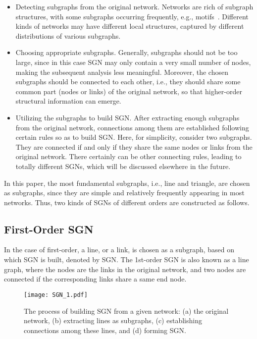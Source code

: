 \documentclass[10pt,journal,compsoc]{IEEEtran}
\begin{document}
\begin{itemize}
\item Detecting subgraphs from the original network. Networks are rich of subgraph structures, with some subgraphs occurring frequently, e.g., motifs~\cite{wernicke2006efficient}. Different kinds of networks may have different local structures, captured by different distributions of various subgraphs.
\item Choosing appropriate subgraphs. Generally, subgraphs should not be too large, since in this case SGN may only contain a very small number of nodes, making the subsequent analysis less meaningful. Moreover, the chosen subgraphs should be connected to each other, i.e., they should share some common part (nodes or links) of the original network, so that higher-order structural information can emerge.
\item Utilizing the subgraphs to build SGN. After extracting enough subgraphs from the original network, connections among them are established following certain rules so as to build SGN. Here, for simplicity, consider two subgraphs. They are connected if and only if they share the same nodes or links from the original network. There certainly can be other connecting rules, leading to totally different SGNs, which will be discussed elsewhere in the future.
\end{itemize}

In this paper, the most fundamental subgraphs, i.e., line and triangle, are chosen as subgraphs, since they are simple and relatively frequently appearing in most networks. Thus, two kinds of SGNs of different orders are constructed as follows.

\subsection{First-Order SGN}
In the case of first-order, a line, or a link, is chosen as a subgraph, based on which SGN is built, denoted by SGN. The 1st-order SGN is also known as a line graph, where the nodes are the links in the original network, and two nodes are connected if the corresponding links share a same end node.

\begin{figure}[!t]
	\centering
	\texttt{[image: SGN\_1.pdf]}
	\caption{The process of building SGN from a given network: (a) the original network, (b) extracting lines as subgraphs, (c) establishing connections among these lines, and (d) forming SGN.}
	\label{fig:line}
\end{figure}
\end{document}
